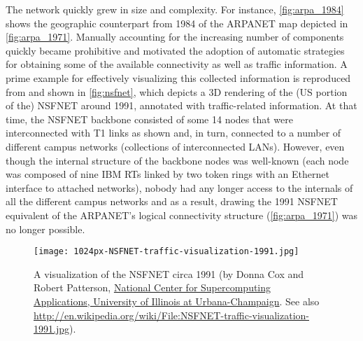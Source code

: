 The network quickly grew in size and complexity. For instance,
\autoref{fig:arpa_1984} shows the geographic counterpart from 1984 of
the ARPANET map depicted in \autoref{fig:arpa_1971}.  Manually
accounting for the increasing number of components quickly became
prohibitive and motivated the adoption of automatic strategies for
obtaining some of the available connectivity as well as traffic
information.  A prime example for effectively visualizing this
collected information is reproduced from
\cite{frazer:_merit_histor_nsfnet_backb_projec} and shown in
\autoref{fig:nsfnet}, which depicts a 3D rendering of the (US portion
of the) NSFNET around 1991, annotated with traffic-related
information. At that time, the NSFNET backbone consisted of some 14
nodes that were interconnected with T1 links as shown and, in turn,
connected to a number of different campus networks (\eg collections of
interconnected LANs). However, even though the internal structure of
the backbone nodes was well-known (\ie each node was composed of nine
IBM RTs linked by two token rings with an Ethernet interface to
attached networks), nobody had any longer access to the internals of
all the different campus networks and as a result, drawing the 1991
NSFNET equivalent of the ARPANET's logical connectivity structure
(\autoref{fig:arpa_1971}) was no longer possible.
 
\begin{figure}[htb]
  \begin{center}
    \texttt{[image: 1024px-NSFNET-traffic-visualization-1991.jpg]}
    \caption{A visualization of the NSFNET circa 1991 (by Donna Cox
and Robert Patterson,
\href{http://avl.ncsa.illinois.edu/project-archive/visualizing-the-early-internet}{National
Center for Supercomputing Applications, University of Illinois at
Urbana-Champaign}. See also
\url{http://en.wikipedia.org/wiki/File:NSFNET-traffic-visualization-1991.jpg}).
      \label{fig:nsfnet}}
  \end{center}
\end{figure}

